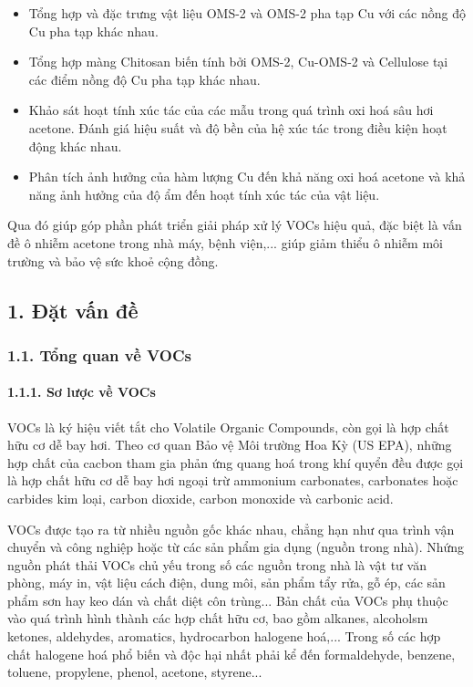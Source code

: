\documentclass{article} %
\begin{document}
\begin{itemize}
    \item Tổng hợp và đặc trưng vật liệu OMS-2 và OMS-2 pha tạp Cu với các nồng độ Cu pha tạp khác nhau.
    \item Tổng hợp màng Chitosan biến tính bởi OMS-2, Cu-OMS-2 và Cellulose tại các điểm nồng độ Cu pha tạp khác nhau.
    \item Khảo sát hoạt tính xúc tác của các mẫu trong quá trình oxi hoá sâu hơi acetone. Đánh giá hiệu suất và độ bền của hệ xúc tác trong điều kiện hoạt động khác nhau.
    \item Phân tích ảnh hưởng của hàm lượng Cu đến khả năng oxi hoá acetone và khả năng ảnh hưởng của độ ẩm đến hoạt tính xúc tác của vật liệu.
\end{itemize}

Qua đó giúp góp phần phát triển giải pháp xử lý VOCs hiệu quả, đặc biệt là vấn đề ô nhiễm acetone trong nhà máy, bệnh viện,... giúp giảm thiểu ô nhiễm môi trường và bảo vệ sức khoẻ cộng đồng.

\cleardoublepage

\subsection*{1. Đặt vấn đề}
 {}
\setcounter{section}{1}
\setcounter{figure}{0}
\setcounter{table}{0}
\subsubsection*{1.1. Tổng quan về VOCs}
 {}
\paragraph*{1.1.1. Sơ lược về VOCs}
\leavevmode

VOCs là ký hiệu viết tắt cho Volatile Organic Compounds, còn gọi là hợp chất hữu cơ dễ bay hơi. Theo cơ quan Bảo vệ Môi trường Hoa Kỳ (US EPA), những hợp chất của cacbon tham gia phản ứng quang hoá trong khí quyển đều được gọi là hợp chất hữu cơ dễ bay hơi ngoại trừ ammonium carbonates, carbonates hoặc carbides kim loại, carbon dioxide, carbon monoxide và carbonic acid.

VOCs được tạo ra từ nhiều nguồn gốc khác nhau, chẳng hạn như qua trình vận chuyển và công nghiệp hoặc từ các sản phẩm gia dụng (nguồn trong nhà). Nhứng nguồn phát thải VOCs chủ yếu trong số các nguồn trong nhà là vật tư văn phòng, máy in, vật liệu cách điện, dung môi, sản phẩm tẩy rửa, gỗ ép, các sản phẩm sơn hay keo dán và chất diệt côn trùng... Bản chất của VOCs phụ thuộc vào quá trình hình thành các hợp chất hữu cơ, bao gồm alkanes, alcoholsm ketones, aldehydes, aromatics, hydrocarbon halogene hoá,... Trong số các hợp chất halogene hoá phổ biến và độc hại nhất phải kể đến formaldehyde, benzene, toluene, propylene, phenol, acetone, styrene...
\end{document}
